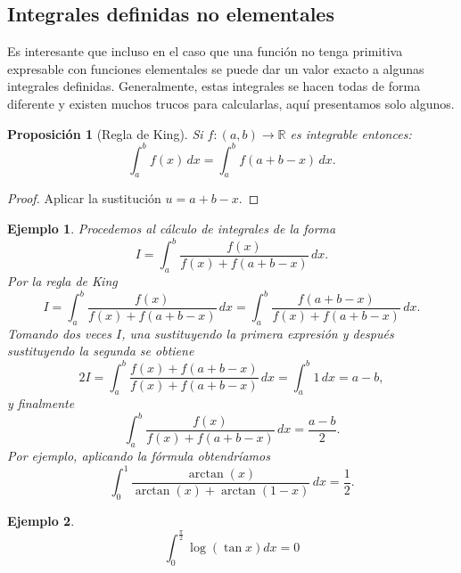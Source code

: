 \documentclass{article}
\newtheorem{prop}{Proposición}
\newtheorem{ejem}{Ejemplo}
\newcommand{\reales}{\mathbb{R}}
\begin{document}
\subsection{Integrales definidas no elementales}
Es interesante que incluso en el caso que una función no tenga primitiva expresable con funciones elementales se puede dar un valor exacto a algunas integrales definidas. Generalmente, estas integrales se hacen todas de forma diferente y existen muchos trucos para calcularlas, aquí presentamos solo algunos.

\begin{prop}[Regla de King]
	Si $f: (a, b) \rightarrow \reales$ es integrable entonces:
	\begin{equation*}
		\int_a^b f(x) \,dx = \int_a^b f(a+b-x) \,dx.
	\end{equation*}
\end{prop}
\begin{proof}
	Aplicar la sustitución $u = a + b - x$.
\end{proof}

\begin{ejem}
	Procedemos al cálculo de integrales de la forma
	\begin{equation*}
		I = \int_a^b \frac{f(x)}{f(x) + f(a + b - x)} \,dx.
	\end{equation*}
	Por la regla de King
	\begin{equation*}
		I = \int_a^b \frac{f(x)}{f(x) + f(a + b - x)} \,dx = \int_a^b \frac{f(a+b-x)}{f(x) + f(a + b - x)} \,dx.
	\end{equation*}
	Tomando dos veces $I$, una sustituyendo la primera expresión y después sustituyendo la segunda se obtiene
	\begin{equation*}
		2I = \int_a^b \frac{f(x) + f(a + b - x)}{f(x) + f(a + b - x)} \,dx = \int_a^b 1 \,dx = a - b,
	\end{equation*}
	y finalmente
	\begin{equation*}
		\int_a^b \frac{f(x)}{f(x) + f(a + b - x)} \,dx = \frac{a-b}{2}.
	\end{equation*}
	Por ejemplo, aplicando la fórmula obtendríamos
	\begin{equation*}
		\int_0^1 \frac{\arctan(x)}{\arctan(x) + \arctan(1 - x)} \,dx = \frac{1}{2}.
	\end{equation*}
\end{ejem}

\begin{ejem}
	\begin{equation*}
		\int_0^{\frac{\pi}{2}} \log(\tan x)dx = 0
	\end{equation*}
\end{ejem}
\end{document}
